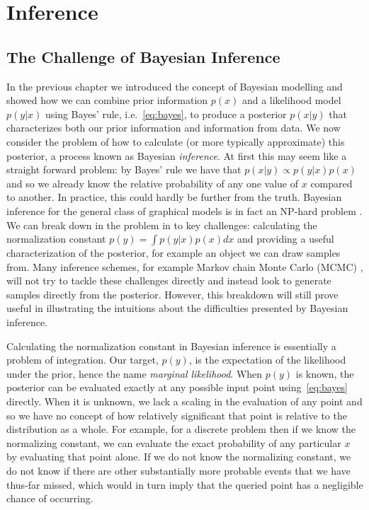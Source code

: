 
\chapter{Inference}
\label{sec:inf}

\section{The Challenge of Bayesian Inference}
\label{sec:inf:challenge}

In the previous chapter we introduced the concept of Bayesian modelling and showed how we
can combine prior information $p(x)$ and a likelihood model $p(y|x)$ using Bayes' rule,
i.e.~\eqref{eq:bayes}, to produce a posterior $p(x|y)$ that
characterizes both our prior information and information from data.  We now consider the
problem of how to calculate (or more typically approximate) this posterior, a process 
known as Bayesian \emph{inference}.
At first this may seem like a straight forward problem: by Bayes' rule we have that
$p(x|y)\propto p(y|x)p(x)$ and so we already know the relative probability of any one
value of $x$ compared to another.  In practice, this could hardly be further from the
truth.  Bayesian inference for the general class of graphical models is in fact an 
NP-hard problem \citep{cooper1990computational,dagum1993approximating}.  We can break
down in the problem in to key challenges: calculating the normalization constant
$p(y) = \int p(y|x)p(x)dx$ and providing a useful characterization of the posterior, for
example an object we can draw samples from.  Many inference schemes, for example Markov
chain Monte Carlo (MCMC) \citep{hastings1970monte}, will not
try to tackle these challenges directly and instead look to generate samples directly from 
the posterior.  However, this breakdown will still prove useful in illustrating the intuitions
about the difficulties presented by Bayesian inference.

Calculating the normalization constant in Bayesian inference is essentially a problem of
integration.  Our target, $p(y)$, is the expectation of the likelihood under the prior,
hence the name \emph{marginal likelihood}.  When $p(y)$ is known, the posterior can be evaluated
exactly at any possible input point using~\eqref{eq:bayes} directly.  When it is unknown, we lack
a scaling in the evaluation of any point and so we have no concept of how relatively 
significant that point is relative to the distribution as a whole.  For example, for a discrete
problem then if we know the normalizing constant, we can evaluate the exact probability of any
particular $x$ by evaluating that point alone.  If we do not know the normalizing constant, we do
not know if there are other substantially more probable events that we have thus-far missed, which
would in turn imply that the queried point has a negligible chance of occurring.
 

